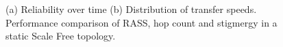 \begin{figure}
    \centering
    \caption{(a) Reliability over time (b) Distribution of transfer speeds. Performance comparison of RASS, hop count and stigmergy in a static Scale Free topology.}
    \label{results:staticTopologyScale}
    \vspace{-2mm}
\end{figure}


